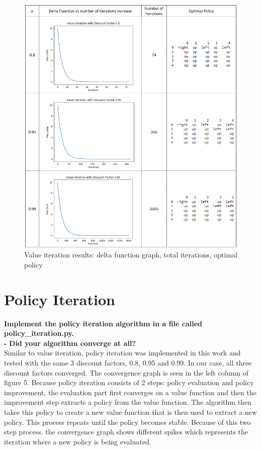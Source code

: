 \documentclass[11pt]{article}
\begin{document}
\newpage
\begin{figure}[h]
\includegraphics[scale=0.5]{VI_chart}
\centering
\caption{Value iteration results: delta function graph, total iterations, optimal policy}
\end{figure}


\newpage
\section{Policy Iteration}
\textbf{Implement the policy iteration algorithm in a file called
policy\_iteration.py.}
\\

\noindent
\textbf{-}
\noindent
\textbf{Did your algorithm converge at all?}
\\

\noindent
Similar to value iteration, policy iteration was implemented in this work and
tested with the same 3 discount factors, 0.8, 0.95 and 0.99. In our case, all
three discount factors converged. The convergence graph is seen in the left
column of figure 5. Because policy iteration consists of 2 steps: policy
evaluation and policy improvement, the evaluation part first converges on a
value function and then the improvement step extracts a policy from the value
function. The algorithm then takes this policy to create a new value function
that is then used to extract a new policy. This process repeats until the policy
becomes stable. Because of this two step process. the convergence graph shows
different spikes which represents the iteration where a new policy is being
evaluated.
\\
\end{document}

